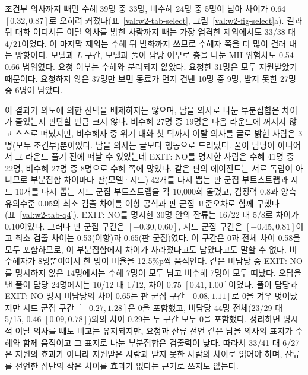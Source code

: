 조건부 의사까지 빼면 수혜 39명 중 33명, 비수혜 24명 중 5명이 남아 차이가 0.64 $[0.32, 0.87]$로 오히려 커졌다(표~\ref{val:w2-tab-select}, 그림~\ref{val:w2-fig-select}a). 결과 뒤 대화 어디서든 이탈 의사를 밝힌 사람까지 빼는 가장 엄격한 제외에서도 33/38 대 4/21이었다. 이 마지막 제외는 수혜 뒤 발화까지 쓰므로 수혜자 쪽을 더 많이 걸러 내는 방향이다. 모델과 $L$ 구간, 모델과 풀이 담당 여부로 층을 나눈 MH 위험차도 0.54--0.66 범위였다. 요청 여부는 수혜와 분리되지 않았다. 요청한 31명은 모두 지원받았기 때문이다. 요청하지 않은 37명만 보면 동료가 먼저 건넨 10명 중 9명, 받지 못한 27명 중 6명이 남았다.

이 결과가 의도에 의한 선택을 배제하지는 않으며, 남을 의사로 나눈 부분집합은 차이가 줄었는지 판단할 만큼 크지 않다. 비수혜 27명 중 19명은 다음 라운드에 꺼지지 않고 스스로 떠났지만, 비수혜자 중 위기 대화 첫 틱까지 이탈 의사를 글로 밝힌 사람은 3명(모두 조건부)뿐이었다. 남을 의사는 글보다 행동으로 드러났다. 풀이 담당이 아니어서 그 라운드 풀기 전에 떠날 수 있었는데 EXIT: NO를 명시한 사람은 수혜 41명 중 22명, 비수혜 27명 중 8명으로 수혜 쪽에 많았다. 같은 판의 에이전트는 서로 독립이 아니므로 부분집합 차이마다 판(모델·시드) 42개를 다시 뽑는 판 군집 부트스트랩과 시드 10개를 다시 뽑는 시드 군집 부트스트랩을 각 10,000회 돌렸고, 검정력 0.8과 양측 유의수준 0.05의 최소 검출 차이를 이항 공식과 판 군집 표준오차로 함께 구했다(표~\ref{val:w2-tab-q4}). EXIT: NO를 명시한 30명 안의 잔류는 16/22 대 5/8로 차이가 0.10이었다. 그러나 판 군집 구간은 $[-0.30, 0.60]$, 시드 군집 구간은 $[-0.45, 0.81]$이고 최소 검출 차이는 0.53(이항)과 0.65(판 군집)였다. 이 구간은 0과 전체 차이 0.58을 모두 포함하므로, 이 부분집합에서 차이가 사라졌다고도 남았다고도 말할 수 없다. 비수혜자가 8명뿐이어서 한 명이 비율을 12.5\%p씩 움직인다. 같은 비담당 중 EXIT: NO를 명시하지 않은 14명에서는 수혜 7명이 모두 남고 비수혜 7명이 모두 떠났다. 오답을 낸 풀이 담당 24명에서는 10/12 대 1/12, 차이 0.75 $[0.41, 1.00]$이었다. 풀이 담당과 EXIT: NO 명시 비담당의 차이 0.65는 판 군집 구간 $[0.08, 1.11]$로 0을 겨우 벗어났지만 시드 군집 구간 $[-0.27, 1.28]$은 0을 포함했고, 비담당 44명 전체(23/29 대 5/15, 0.46 $[0.09, 0.78]$)와의 차이 0.29는 두 구간 모두 0을 포함했다. 정리하면 명시적 이탈 의사를 빼도 비교는 유지되지만, 요청과 잔류 선언 같은 남을 의사의 표지가 수혜와 함께 움직이고 그 표지로 나눈 부분집합은 검출력이 낮다. 따라서 33/41 대 6/27은 지원의 효과가 아니라 지원받은 사람과 받지 못한 사람의 차이로 읽어야 하며, 잔류를 선언한 집단의 작은 차이를 효과가 없다는 근거로 쓰지도 않는다.

